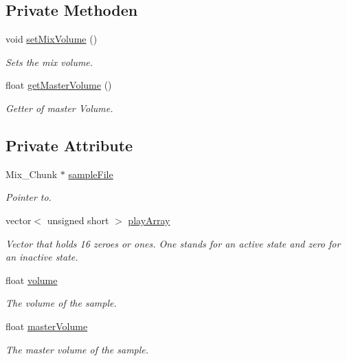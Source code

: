 \subsection*{Private Methoden}
\begin{DoxyCompactItemize}
\item 
void \hyperlink{class_sample_a6d13988721d2190947f65969d4737a48}{set\+Mix\+Volume} ()
\begin{DoxyCompactList}\small\item\em Sets the mix volume. \end{DoxyCompactList}\item 
float \hyperlink{class_sample_afceddb412ab50a67cb98ca6b72456f24}{get\+Master\+Volume} ()
\begin{DoxyCompactList}\small\item\em Getter of master Volume. \end{DoxyCompactList}\end{DoxyCompactItemize}
\subsection*{Private Attribute}
\begin{DoxyCompactItemize}
\item 
Mix\+\_\+\+Chunk $\ast$ \hyperlink{class_sample_ae158342c8d18a05de1c85802f7cfbd2a}{sample\+File}
\begin{DoxyCompactList}\small\item\em Pointer to. \end{DoxyCompactList}\item 
vector$<$ unsigned short $>$ \hyperlink{class_sample_a824014df7294cb94445e7ee89cc15987}{play\+Array}
\begin{DoxyCompactList}\small\item\em Vector that holds 16 zeroes or ones. One stands for an active state and zero for an inactive state. \end{DoxyCompactList}\item 
float \hyperlink{class_sample_a74a4b4799b2bdec9fdde363992b9cec8}{volume}
\begin{DoxyCompactList}\small\item\em The volume of the sample. \end{DoxyCompactList}\item 
float \hyperlink{class_sample_a2d48ff8caf8425c37cf74130afb0c87a}{master\+Volume}
\begin{DoxyCompactList}\small\item\em The master volume of the sample. \end{DoxyCompactList}\end{DoxyCompactItemize}


